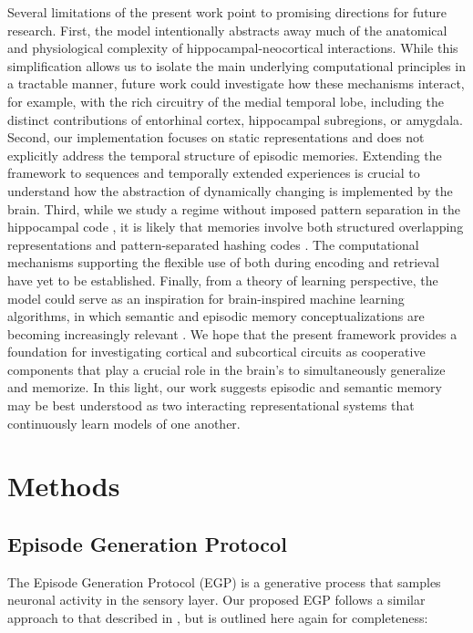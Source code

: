 \documentclass{article}
\providecommand{\DIFaddtex}[1]{{\protect\color{blue}\uwave{#1}}} %
\providecommand{\DIFaddbegin}{} %
\providecommand{\DIFaddend}{} %
\providecommand{\DIFadd}[1]{\texorpdfstring{\DIFaddtex{#1}}{#1}} %
\begin{document}
Several limitations of the present work point to promising directions for future research. First, the model intentionally abstracts away much of the anatomical and physiological complexity of hippocampal-neocortical interactions. While this simplification allows us to isolate the main underlying computational principles in a tractable manner, future work could investigate how these mechanisms interact, for example, with the rich circuitry of the medial temporal lobe, including the distinct contributions of entorhinal cortex, hippocampal subregions, or amygdala. Second, our implementation focuses on static representations and does not explicitly address the temporal structure of episodic memories. Extending the framework to sequences and temporally extended experiences is crucial to understand how the abstraction of dynamically changing  \DIFaddbegin \DIFadd{environments }\DIFaddend is implemented by the brain. Third, while we study a regime without imposed pattern separation in the hippocampal code   , it is likely that memories involve both structured overlapping representations and pattern-separated hashing codes . The computational mechanisms supporting the flexible use of both during encoding and retrieval have yet to be established. Finally, from a theory of learning perspective, the model could serve as an inspiration for brain-inspired machine learning algorithms, in which semantic and episodic memory conceptualizations are becoming increasingly relevant .  
\newline\newline
We hope that the present framework provides a foundation for investigating cortical and subcortical circuits as cooperative components that play a crucial role in the brain's  \DIFaddbegin \DIFadd{ability }\DIFaddend to simultaneously generalize and memorize. In this light, our work suggests \DIFaddbegin \DIFadd{that }\DIFaddend episodic and semantic memory may  be best understood as two interacting representational systems that continuously learn models of one another.
\newpage
\section*{Methods}\label{methods}
\subsection*{Episode Generation Protocol}
The Episode Generation Protocol (EGP) is a generative process that samples neuronal activity in the sensory layer. Our proposed EGP follows a similar approach to that described in , but is outlined here again for completeness:
\end{document}
